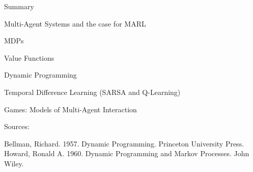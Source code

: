         




\begin{frame}{Summary}

\blist
    \item Multi-Agent Systems and the case for MARL
    \item MDPs
    \item Value Functions
    \item Dynamic Programming
    \item Temporal Difference Learning (SARSA and Q-Learning)
\elist
{}
\blist
    \item Games: Models of Multi-Agent Interaction
\elist

\end{frame}

\begin{frame}{Sources:}

Bellman, Richard. 1957. Dynamic Programming. Princeton University Press.
\vspace{20pt}
Howard, Ronald A. 1960. Dynamic Programming and Markov Processes. John Wiley.
\end{frame}

